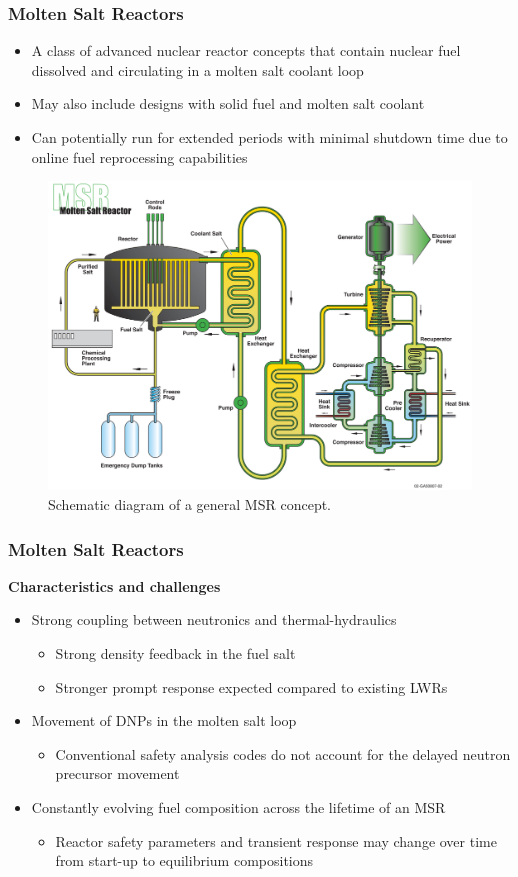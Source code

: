 \begin{frame}
	\frametitle{Molten Salt Reactors}
		\begin{itemize}
			\item A class of advanced nuclear reactor concepts that contain
			nuclear fuel dissolved and circulating in a molten salt coolant
			loop
			\item May also include designs with solid fuel and molten salt
			coolant
			\item Can potentially run for extended periods with minimal shutdown
			time due to online fuel reprocessing capabilities
		\end{itemize}
		\begin{figure}
			\centering
			\includegraphics[width=.5\textwidth]{./images/msr}
			\caption{Schematic diagram of a general \gls{MSR} concept.}
			\label{fig:msr}
		\end{figure}
\end{frame}

\begin{frame}
	\frametitle{Molten Salt Reactors}
		\textbf{Characteristics and challenges}
		\begin{itemize}
			\item Strong coupling between neutronics and thermal-hydraulics
			\begin{itemize}
				\item Strong density feedback in the fuel salt
				\item Stronger prompt response expected compared to
				existing LWRs
			\end{itemize}
			\item Movement of \glspl{DNP} in the molten
			salt loop
			\begin{itemize}
				\item Conventional safety analysis codes do not account for the
				delayed neutron precursor movement
			\end{itemize}
			\item Constantly evolving fuel composition across the lifetime of an
			\gls{MSR}
			\begin{itemize}
				\item Reactor safety parameters and transient response may
				change over time from start-up to equilibrium compositions
			\end{itemize}
		\end{itemize}
\end{frame}
